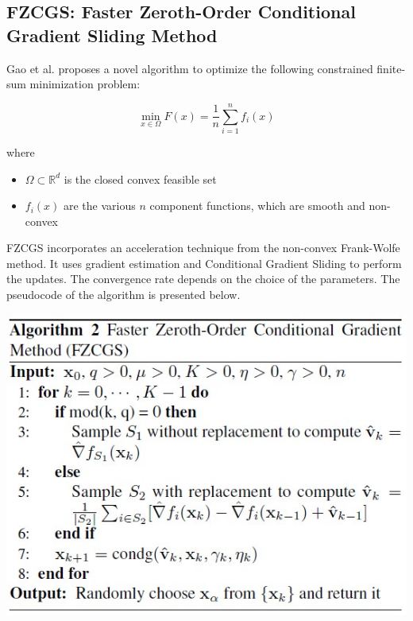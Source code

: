 \documentclass[10pt,twocolumn,letterpaper]{article}
\begin{document}
\subsection{FZCGS: Faster Zeroth-Order Conditional Gradient Sliding Method}

Gao et al.\cite{Gao} proposes a novel algorithm to optimize the following constrained finite-sum minimization problem:

\[
\min _{x \in \Omega} F(x)=\frac{1}{n} \sum_{i=1}^{n} f_{i}(x)
\]

where

\begin{itemize}

\item $\Omega \subset \mathbb{R}^{d}$ is the closed convex feasible set
\item $f_{i}(x)$ are the various $n$ component functions, which are smooth and non-convex
\end{itemize}


FZCGS incorporates an acceleration technique from the non-convex Frank-Wolfe method.
It uses gradient estimation and Conditional Gradient Sliding to perform the updates.
The convergence rate depends on the choice of the parameters. The pseudocode of the algorithm is presented below.

\includegraphics*[scale=0.7]{img/fzcgs_pseudocode.jpg} \\
\end{document}
